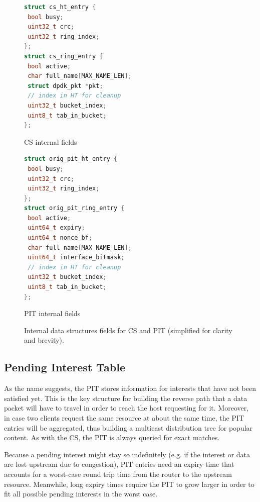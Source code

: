 \documentclass[12pt,a4paper,twoside]{book}
\begin{document}
\begin{figure}[htb]
  \captionsetup{type=lstlisting}
  \begin{sublstlisting}[t]{.5\linewidth}
  \begin{lstlisting}[language=c]
struct cs_ht_entry {
 bool busy;
 uint32_t crc;
 uint32_t ring_index;
};
struct cs_ring_entry {
 bool active;
 char full_name[MAX_NAME_LEN];
 struct dpdk_pkt *pkt;
 // index in HT for cleanup
 uint32_t bucket_index;
 uint8_t tab_in_bucket;
};
    \end{lstlisting}
    \caption{CS internal fields}\label{lst:augustus.cs}
  \end{sublstlisting}%
  \begin{sublstlisting}[t]{.5\linewidth}
  \begin{lstlisting}[language=c]
struct orig_pit_ht_entry {
 bool busy;
 uint32_t crc;
 uint32_t ring_index;
};
struct orig_pit_ring_entry {
 bool active;
 uint64_t expiry;
 uint64_t nonce_bf;
 char full_name[MAX_NAME_LEN];
 uint64_t interface_bitmask;
 // index in HT for cleanup
 uint32_t bucket_index;
 uint8_t tab_in_bucket;
};
    \end{lstlisting}
    \caption{PIT internal fields}\label{lst:augustus.oldpit}
  \end{sublstlisting}
  \caption[CS and original PIT internal data structures fields]{Internal data structures fields for CS and PIT (simplified for clarity and brevity).}\label{lst:augustus.cs_oldpit}
\end{figure}

\subsection{Pending Interest Table}\label{sec:augustus.pit}
As the name suggests, the \gls{PIT} stores information for interests that have not been satisfied yet. This is the key structure for building the reverse path that a data packet will have to travel in order to reach the host requesting for it. Moreover, in case two clients request the same resource at about the same time, the PIT entries will be aggregated, thus building a multicast distribution tree for popular content.
As with the \gls{CS}, the PIT is always queried for exact matches.

Because a pending interest might stay so indefinitely (e.g. if the interest or data are lost upstream due to congestion), PIT entries need an expiry time that accounts for a worst-case round trip time from the router to the upstream resource. Meanwhile, long expiry times require the PIT to grow larger in order to fit all possible pending interests in the worst case.
\end{document}
